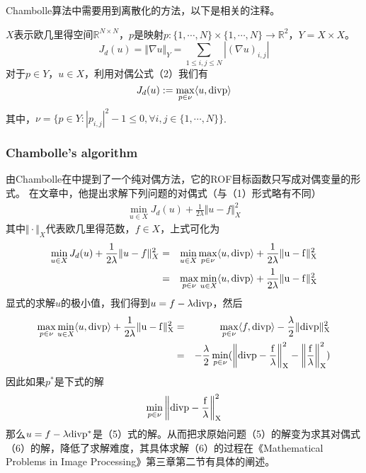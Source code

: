 \documentclass[a4paper,12pt]{article}
\begin{document}
Chambolle算法中需要用到离散化的方法，以下是相关的注释。

$X$表示欧几里得空间$\mathbb{R}^{N\times N}$，$p$是映射$p:\{1,\cdots,N\}\times\{1,\cdots,N\}\rightarrow\mathbb{R}^2$，$Y=X\times X$。
\begin{displaymath}
J_d(u)=\Vert\nabla u\Vert_Y=\sum_{1\leq i,j\leq N}|(\nabla u)_{i,j}|
\end{displaymath}
对于$p\in Y$，$u\in X$，利用对偶公式（2）我们有
\begin{displaymath}
J_d(u):=\max_{p\in \nu} \langle u, \rm div p\rangle
\end{displaymath}
其中，$\nu=\{p\in Y:|p_{i,j}|^2-1\leq 0, \forall i,j\in\{1,\cdots,N\}\}$.

\subsubsection{Chambolle's algorithm}
由Chambolle在\cite{Chambolle:2004du}中提到了一个纯对偶方法，它的ROF目标函数只写成对偶变量的形式。
在文章中，他提出求解下列问题的对偶式（与（1）形式略有不同）
\begin{eqnarray}
\min_{u\in X}J_d(u)+\frac{1}{2\lambda}\Vert u-f\Vert^2_X
\end{eqnarray}
其中$\Vert\cdot\Vert_X$代表欧几里得范数，$f\in X$，上式可化为
\begin{eqnarray*}
\min_{u\in X}J_d(u)+\frac{1}{2\lambda}\Vert u-f\Vert^2_X&=&\min_{u\in X}\max_{p\in \nu}\langle u,\rm div p\rangle+\frac{1}{2\lambda}\Vert u-f \Vert^2_{X}\\
&=&\max_{p\in \nu}\min_{u\in X}\langle u,\rm div p\rangle+\frac{1}{2\lambda}\Vert u-f\Vert^2_{X}
\end{eqnarray*}
显式的求解$u$的极小值，我们得到$u=f-\lambda \rm div p$，然后
\begin{eqnarray*}
\max_{p\in \nu}\min_{u\in X}\langle u,\rm div p\rangle+\frac{1}{2\lambda}\Vert u-f\Vert^2_{X}&=&\max_{p\in \nu}\langle f,\rm div p\rangle-\frac{\lambda}{2}\Vert \rm div p \Vert^2_X\\
&=&-\frac{\lambda}{2}\min_{p\in \nu}(\bigg{\Vert}\rm divp-\frac{f}{\lambda}\bigg{\Vert}_X^2-\bigg{\Vert}\frac{f}{\lambda}\bigg{\Vert}_X^2)
\end{eqnarray*}
因此如果$p^*$是下式的解
\begin{eqnarray}
\min_{p\in \nu}\bigg{\Vert}\rm divp-\frac{f}{\lambda}\bigg{\Vert}_X^2
\end{eqnarray}
那么$u=f-\lambda \rm div p^*$是（5）式的解。从而把求原始问题（5）的解变为求其对偶式（6）的解，降低了求解难度，其具体求解（6）的过程在《Mathematical Problems in Image Processing》第三章第二节有具体的阐述。
\end{document}
